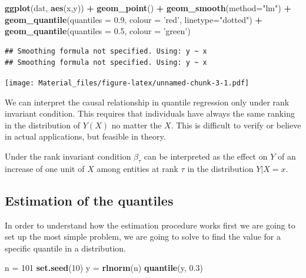 \documentclass[]{book}
\newenvironment{Shaded}{\begin{snugshade}}{\end{snugshade}}
\newcommand{\KeywordTok}[1]{\textcolor[rgb]{0.13,0.29,0.53}{\textbf{#1}}}
\newcommand{\DataTypeTok}[1]{\textcolor[rgb]{0.13,0.29,0.53}{#1}}
\newcommand{\DecValTok}[1]{\textcolor[rgb]{0.00,0.00,0.81}{#1}}
\newcommand{\FloatTok}[1]{\textcolor[rgb]{0.00,0.00,0.81}{#1}}
\newcommand{\StringTok}[1]{\textcolor[rgb]{0.31,0.60,0.02}{#1}}
\newcommand{\OperatorTok}[1]{\textcolor[rgb]{0.81,0.36,0.00}{\textbf{#1}}}
\newcommand{\NormalTok}[1]{#1}
\begin{document}
\begin{Shaded}
\begin{Highlighting}[]
\KeywordTok{ggplot}\NormalTok{(dat, }\KeywordTok{aes}\NormalTok{(x,y)) }\OperatorTok{+}\StringTok{ }\KeywordTok{geom_point}\NormalTok{() }\OperatorTok{+}\StringTok{ }\KeywordTok{geom_smooth}\NormalTok{(}\DataTypeTok{method=}\StringTok{"lm"}\NormalTok{) }\OperatorTok{+}\StringTok{ }
\StringTok{        }\KeywordTok{geom_quantile}\NormalTok{(}\DataTypeTok{quantiles =} \FloatTok{0.9}\NormalTok{, }\DataTypeTok{colour =} \StringTok{'red'}\NormalTok{, }\DataTypeTok{linetype=}\StringTok{"dotted"}\NormalTok{) }\OperatorTok{+}
\StringTok{        }\KeywordTok{geom_quantile}\NormalTok{(}\DataTypeTok{quantiles =} \FloatTok{0.5}\NormalTok{, }\DataTypeTok{colour =} \StringTok{'green'}\NormalTok{) }
\end{Highlighting}
\end{Shaded}

\begin{verbatim}
## Smoothing formula not specified. Using: y ~ x
## Smoothing formula not specified. Using: y ~ x
\end{verbatim}

\texttt{[image: Material\_files/figure-latex/unnamed-chunk-3-1.pdf]}

We can interpret the causal relationship in quantile regression only
under rank invariant condition. This requires that individuals have
always the same ranking in the distribution of \(Y(X)\) no matter the
\(X\). This is difficult to verify or believe in actual applications,
but feasible in theory.

Under the rank invariant condition \(\beta_{\tau}\) can be interpreted
as the effect on \(Y\) of an increase of one unit of \(X\) among
entities at rank \(\tau\) in the distribution \(Y|X=x\).

\subsection{Estimation of the
quantiles}\label{estimation-of-the-quantiles}

In order to understand how the estimation procedure works first we are
going to set up the most simple problem, we are going to solve to find
the value for a specific quantile in a distribution.

\begin{Shaded}
\begin{Highlighting}[]
\NormalTok{n =}\StringTok{ }\DecValTok{101}
\KeywordTok{set.seed}\NormalTok{(}\DecValTok{10}\NormalTok{)}
\NormalTok{y =}\StringTok{ }\KeywordTok{rlnorm}\NormalTok{(n)}
\KeywordTok{quantile}\NormalTok{(y, }\FloatTok{0.3}\NormalTok{)}
\end{Highlighting}
\end{Shaded}
\end{document}

